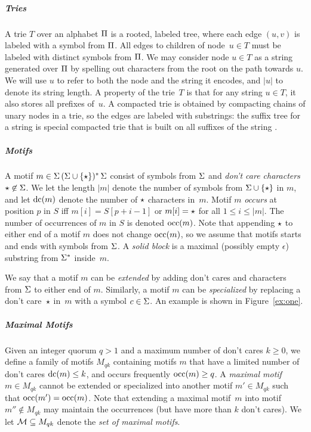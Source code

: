 \subparagraph{Tries}
%
A trie $T$ over an alphabet $\Pi$ is a rooted, labeled tree, where each edge $(u, v)$ is labeled with a symbol from $\Pi$. All edges to children of node~$u \in T$ must be labeled with distinct symbols from $\Pi$. We may consider node $u \in T$ as a string generated over $\Pi$ by spelling out characters from the root on the path towards $u$. We will use $u$ to refer to both the node and the string it encodes, and $|u|$ to denote its string length. A property of the trie~$T$ is that for any string $u \in T$, it also stores all prefixes of~$u$. A compacted trie is obtained by compacting chains of unary nodes in a trie, so the edges are labeled with substrings: the suffix tree for a string is special compacted trie that is built on all suffixes of the string \cite{McCreight}.

\subparagraph{Motifs}
%
A motif $m \in \Sigma \, (\Sigma \cup \{\star\})^* \, \Sigma$ consist of symbols from $\Sigma$ and \emph{don't care characters} $\star \not \in \Sigma$. We let the length $|m|$ denote the number of symbols from $\Sigma \cup \{\star\}$ in $m$, and let $\operatorname{dc}(m)$ denote the number of $\star$ characters in~$m$. Motif $m$ \emph{occurs} at position $p$ in $S$ iff $m[i] = S[p + i - 1]$ or $m[i] = \star$ for all $1 \leq i \leq |m|$. The number of occurrences of $m$ in $S$ is denoted $\operatorname{occ}(m)$. Note that appending $\star$ to either end of a motif $m$ does not change $\operatorname{occ}(m)$, so we assume that motifs starts and ends with symbols from $\Sigma$. A \emph{solid block} is a maximal (possibly empty $\epsilon$) substring from $\Sigma^*$ inside~$m$.

We say that a motif $m$ can be \emph{extended} by adding don't cares and characters from $\Sigma$ to either end of $m$. Similarly, a motif $m$ can be \emph{specialized} by replacing a don't care~$\star$ in~$m$ with a symbol $c \in \Sigma$. An example is shown in Figure~\ref{ex:one}.

\subparagraph{Maximal Motifs}
%
Given an integer quorum $q > 1$ and a maximum number of don't cares $k \geq 0$, we define a family of motifs $M_{qk}$ containing motifs $m$ that have a limited number of don't cares $\operatorname{dc}(m) \leq k$, and occurs frequently $\operatorname{occ}(m) \geq q$. A \emph{maximal motif} $m \in M_{qk}$ cannot be extended or specialized into another motif $m' \in M_{qk}$ such that $\operatorname{occ}(m') = \operatorname{occ}(m)$. Note that extending a maximal motif~$m$ into motif $m'' \not \in M_{qk}$ may maintain the occurrences (but have more than $k$ don't cares). We let $\mathcal{M} \subseteq M_{qk}$ denote the \emph{set of maximal motifs}.

